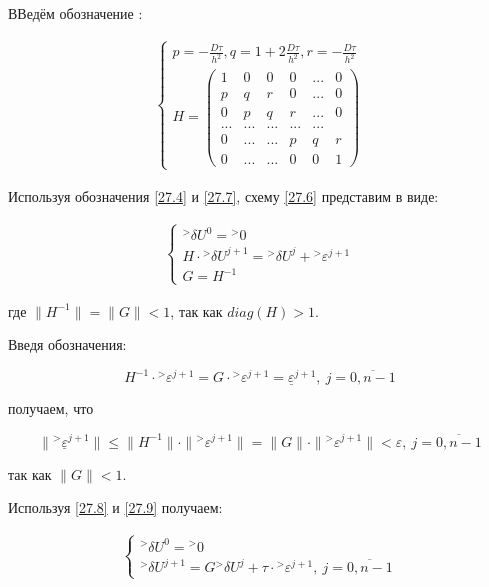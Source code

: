 \documentclass[__main__.tex]{subfiles}
\begin{document}
ВВедём обозначение :

\begin{gather}\label{27.7}
\begin{cases}
p = - \frac{D\tau}{h^2}, q = 1 + 2\frac{D\tau}{h^2},r = - \frac{D\tau}{h^2} \\
H = 
\left(
\begin{matrix}
1 & 0 & 0 & 0 & ... & 0 \\
p & q & r & 0 & ... & 0 \\
0 & p & q & r & ... & 0 \\
... & ... &... &... &... & \\
0 & ... & ... & p & q & r \\
0 &... & ... & 0 & 0 & 1
\end{matrix}
\right)
\end{cases}
\end{gather}

Используя обозначения \ref{27.4} и \ref{27.7}, схему \ref{27.6} представим в виде:

\begin{gather}\label{27.8}
\begin{cases}
{}^> \delta U^0 = {}^>0 \\
H \cdot {}^>\delta U^{j+1} = {}^> \delta U^j + {}^> \varepsilon^{j+1} \\
G = H^{-1}
\end{cases}
\end{gather}

где $\| H^{-1} \| = \| G \| < 1$, так как $diag\left(H\right) > 1$.

Введя обозначения:

$$
H^{-1} \cdot {}^> \varepsilon^{j+1} = G \cdot {}^>\varepsilon^{j+1} = \underline{\varepsilon}^{j+1}, \ j = \overline{0,n-1}
$$

получаем, что 

\begin{equation} \label{27.9}
\| {}^> \underline{\varepsilon}^{j+1} \| \leq \| H^{-1} \| \cdot \| {}^> \varepsilon^{j+1} \| = \| G \| \cdot \| {}^> \varepsilon^{j+1} \| < \varepsilon, \ j = \overline{0,n-1}
\end{equation}

так как $\| G \| < 1$.

Используя \ref{27.8} и \ref{27.9} получаем:

\begin{gather}\label{27.10}
\begin{cases}
{}^> \delta U^0 = {}^> 0 \\
{}^> \delta U^{j+1} = G {}^> \delta U^j + \tau \cdot {}^> \varepsilon^{j+1}, \ j = \overline{0,n-1}
\end{cases}
\end{gather}
\end{document}
